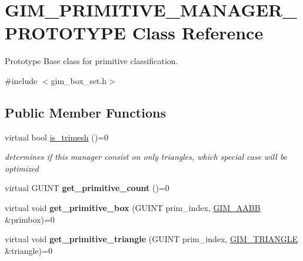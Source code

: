 \hypertarget{class_g_i_m___p_r_i_m_i_t_i_v_e___m_a_n_a_g_e_r___p_r_o_t_o_t_y_p_e}{\section{G\+I\+M\+\_\+\+P\+R\+I\+M\+I\+T\+I\+V\+E\+\_\+\+M\+A\+N\+A\+G\+E\+R\+\_\+\+P\+R\+O\+T\+O\+T\+Y\+P\+E Class Reference}
\label{class_g_i_m___p_r_i_m_i_t_i_v_e___m_a_n_a_g_e_r___p_r_o_t_o_t_y_p_e}
}


Prototype Base class for primitive classification.  




{\ttfamily \#include $<$gim\+\_\+box\+\_\+set.\+h$>$}

\subsection*{Public Member Functions}
\begin{DoxyCompactItemize}
\item 
\hypertarget{class_g_i_m___p_r_i_m_i_t_i_v_e___m_a_n_a_g_e_r___p_r_o_t_o_t_y_p_e_aaad51538aaf2c2652c7e202a9f2d57a5}{virtual bool \hyperlink{class_g_i_m___p_r_i_m_i_t_i_v_e___m_a_n_a_g_e_r___p_r_o_t_o_t_y_p_e_aaad51538aaf2c2652c7e202a9f2d57a5}{is\+\_\+trimesh} ()=0}\label{class_g_i_m___p_r_i_m_i_t_i_v_e___m_a_n_a_g_e_r___p_r_o_t_o_t_y_p_e_aaad51538aaf2c2652c7e202a9f2d57a5}

\begin{DoxyCompactList}\small\item\em determines if this manager consist on only triangles, which special case will be optimized \end{DoxyCompactList}\item 
\hypertarget{class_g_i_m___p_r_i_m_i_t_i_v_e___m_a_n_a_g_e_r___p_r_o_t_o_t_y_p_e_a94c3fab9efdfec58d4c55394f8531463}{virtual G\+U\+I\+N\+T {\bfseries get\+\_\+primitive\+\_\+count} ()=0}\label{class_g_i_m___p_r_i_m_i_t_i_v_e___m_a_n_a_g_e_r___p_r_o_t_o_t_y_p_e_a94c3fab9efdfec58d4c55394f8531463}

\item 
\hypertarget{class_g_i_m___p_r_i_m_i_t_i_v_e___m_a_n_a_g_e_r___p_r_o_t_o_t_y_p_e_a346c6eddcf63f67097a3d564ada57661}{virtual void {\bfseries get\+\_\+primitive\+\_\+box} (G\+U\+I\+N\+T prim\+\_\+index, \hyperlink{class_g_i_m___a_a_b_b}{G\+I\+M\+\_\+\+A\+A\+B\+B} \&primbox)=0}\label{class_g_i_m___p_r_i_m_i_t_i_v_e___m_a_n_a_g_e_r___p_r_o_t_o_t_y_p_e_a346c6eddcf63f67097a3d564ada57661}

\item 
\hypertarget{class_g_i_m___p_r_i_m_i_t_i_v_e___m_a_n_a_g_e_r___p_r_o_t_o_t_y_p_e_ad123d015b328ccfd1adee56517fd4b17}{virtual void {\bfseries get\+\_\+primitive\+\_\+triangle} (G\+U\+I\+N\+T prim\+\_\+index, \hyperlink{class_g_i_m___t_r_i_a_n_g_l_e}{G\+I\+M\+\_\+\+T\+R\+I\+A\+N\+G\+L\+E} \&triangle)=0}\label{class_g_i_m___p_r_i_m_i_t_i_v_e___m_a_n_a_g_e_r___p_r_o_t_o_t_y_p_e_ad123d015b328ccfd1adee56517fd4b17}

\end{DoxyCompactItemize}


